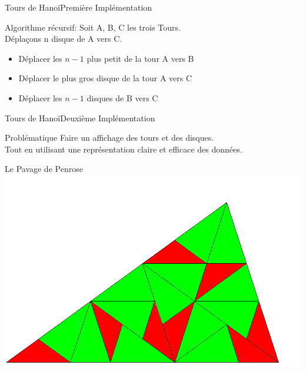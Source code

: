 \documentclass[11pt]{beamer}
\begin{document}
\begin{frame}{Tours de Hanoï}{Première Implémentation}
  \begin{block}{Algorithme récursif:}
    Soit A, B, C les trois Tours. \\
    Déplaçons n disque de A vers C.
    \begin{itemize}
    \item Déplacer les $n-1$ plus petit de la tour A vers B
    \item Déplacer le plus gros disque de la tour A vers C
    \item Déplacer les $n-1$ disques de B vers C
    \end{itemize}
  \end{block}
\end{frame}


\begin{frame}{Tours de Hanoï}{Deuxième Implémentation}

\begin{block}{Problématique}
  Faire un affichage des tours et des disques. \\
  Tout en utilisant une représentation claire et efficace des données.

\end{block}
\end{frame}

\begin{frame}{Le Pavage de Penrose}
    \includegraphics[scale=0.3]{penrose_example.png}
\end{frame}
\end{document}
